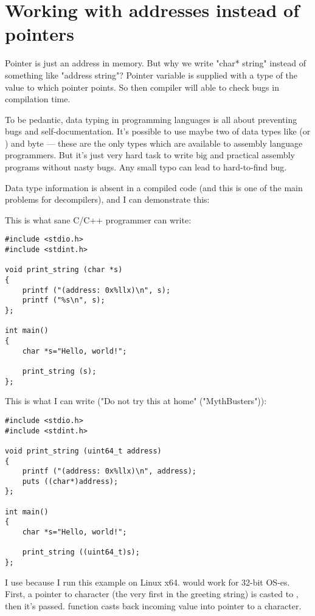 \section{Working with addresses instead of pointers}

Pointer is just an address in memory. But why we write "char* string" instead of something like "address string"?
Pointer variable is supplied with a type of the value to which pointer points.
So then compiler will able to check bugs in compilation time.

To be pedantic, data typing in programming languages is all about preventing bugs and self-documentation.
It's possible to use maybe two of data types like  (or ) and byte --- these are the only types which are available to assembly language programmers.
But it's just very hard task to write big and practical assembly programs without nasty bugs.
Any small typo can lead to hard-to-find bug.

Data type information is absent in a compiled code (and this is one of the main problems for decompilers), and I can demonstrate this:

This is what sane C/C++ programmer can write:

\begin{lstlisting}
#include <stdio.h>
#include <stdint.h>

void print_string (char *s)
{
	printf ("(address: 0x%llx)\n", s);
	printf ("%s\n", s);
};

int main()
{
	char *s="Hello, world!";

	print_string (s);
};
\end{lstlisting}

This is what I can write ("Do not try this at home" ("MythBusters")):

\begin{lstlisting}
#include <stdio.h>
#include <stdint.h>

void print_string (uint64_t address)
{
	printf ("(address: 0x%llx)\n", address);
	puts ((char*)address);
};

int main()
{
	char *s="Hello, world!";

	print_string ((uint64_t)s);
};
\end{lstlisting}

I use  because I run this example on Linux x64.  would work for 32-bit OS-es.
First, a pointer to character (the very first in the greeting string) is casted to , then it's passed.
 function casts back incoming  value into pointer to a character.


